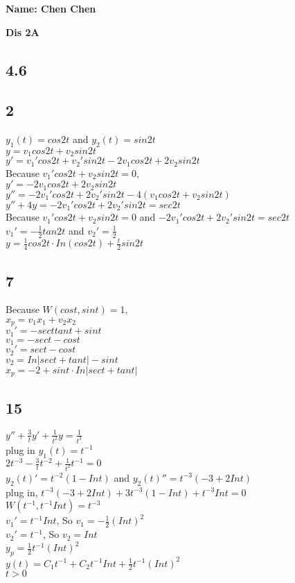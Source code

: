 \documentclass[12pt, a4paper]{IEEEtran}
\begin{document}
    \centerline{\textbf{Name: Chen Chen}}
    
    \centerline{\textbf{Dis 2A}}
    \begin{flushleft}
    
    
    \section*{4.6}
    \subsection*{2}
    $y_1(t)=cos2t$ and $y_2(t)=sin2t$\\
    $y=v_1cos2t+v_2sin2t$\\
    $y'=v_1'cos2t+v_2'sin2t-2v_1cos2t+2v_2sin2t$\\
    Because $v_1'cos2t+v_2sin2t=0$,\\
    $y'=-2v_1cos2t+2v_2sin2t$\\
    $y''=-2v_1'cos2t+2v_2'sin2t-4(v_1cos2t+v_2sin2t)$\\
    $y''+4y=-2v_1'cos2t+2v_2'sin2t=sec2t$\\
    Because $v_1'cos2t+v_2sin2t=0$ and $-2v_1'cos2t+2v_2'sin2t=sec2t$\\
    $v_1'=-\frac{1}{2}tan2t$ and $v_2'=\frac{1}{2}$\\
    $y=\frac{1}{4}cos2t\cdot In(cos2t)+\frac{t}{2}sin2t$\\
    
    \subsection*{7}
    Because $W(cost, sint)=1$,\\
    $x_p=v_1x_1+v_2x_2$\\
    $v_1'=-secttant+sint$\\
    $v_1=-sect-cost$\\
    $v_2'=sect-cost$\\
    $v_2=In|sect+tant|-sint$\\
    $x_p=-2+sint\cdot In|sect+tant|$\\
    
    \subsection*{15}
    $y''+\frac{3}{t}y'+\frac{1}{t^2}y=\frac{1}{t^3}$\\
    plug in $y_1(t)=t^{-1}$\\
    $2t^{-3}-\frac{3}{t}t^{-2}+\frac{1}{t^2}t^{-1}=0$\\
    $y_2(t)'=t^{-2}(1-Int)$ and $y_2(t)''=t^{-3}(-3+2Int)$\\
    plug in, $t^{-3}(-3+2Int)+3t^{-3}(1-Int)+t^{-3}Int=0$\\
    $W(t^{-1}, t^{-1}Int)=t^{-3}$\\
    $v_1'=t^{-1}Int$, So $v_1=-\frac{1}{2}(Int)^2$\\
    $v_2'=t^{-1}$, So $v_2=Int$\\
    $y_p=\frac{1}{2}t^{-1}(Int)^2$\\
    $y(t)=C_1t^{-1}+C_2t^{-1}Int+\frac{1}{2}t^{-1}(Int)^2$\\
    $t>0$\\
    


\end{flushleft}
\end{document}
